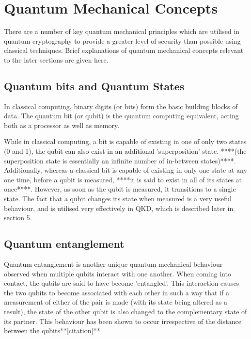 \documentclass[runningheads,a4paper]{llncs}
\begin{document}
\section{Quantum Mechanical Concepts}

There are a number of key quantum mechanical principles which are utilised in quantum cryptography to provide a greater level of security than possible using classical techniques. Brief explanations of quantum mechanical concepts relevant to the later sections are given here.

\subsection{Quantum bits and Quantum States}

In classical computing, binary digits (or bits) form the basic building blocks of data. The quantum bit (or qubit) is the quantum computing equivalent, acting both as a processor as well as memory. 

While in classical computing, a bit is capable of existing in one of only two states (0 and 1), the qubit can also exist in an additional 'superposition' state. ****(the superposition state is essentially an infinite number of in-between states)****. Additionally, whereas a classical bit is capable of existing in only one state at any one time, before a qubit is measured, ****it is said to exist in all of its states at once****. However, as soon as the qubit is measured, it transitions to a single state. The fact that a qubit changes its state when measured is a very useful behaviour, and is utilised very effectively in QKD, which is described later in section 5.

\subsection{Quantum entanglement}

Quantum entanglement is another unique quantum mechanical behaviour observed when multiple qubits interact with one another. When coming into contact, the qubits are said to have become 'entangled'. This interaction causes the two qubits to become associated with each other in such a way that if a measurement of either of the pair is made (with its state being altered as a result), the state of the other qubit is also changed to the complementary state of its partner. This behaviour has been shown to occur irrespective of the distance between the qubits**[citation]**.
\end{document}
